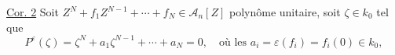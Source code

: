 \uline{Cor. 2} Soit  $Z^N+f_1Z^{N-1}+\cdots+f_N\in \mathcal A_n[Z]$ polynôme unitaire, soit $\zeta\in k_0$ tel que
\[
P^\varepsilon(\zeta)=\zeta^N+a_1\zeta^{N-1}+\cdots+a_N=0,
\quad\text{où les }a_i=\varepsilon(f_i)=f_i(0)\in k_0,
\]
